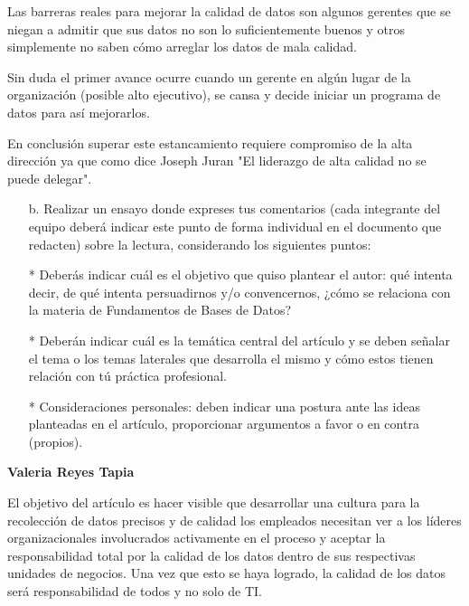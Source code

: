\documentclass{article}
\begin{document}
Las barreras reales para mejorar la calidad de datos son algunos gerentes que se niegan a admitir que sus datos no son lo suficientemente buenos y otros simplemente no saben cómo arreglar los datos de mala calidad.

Sin duda el primer avance ocurre cuando un gerente en algún lugar de la organización  (posible alto ejecutivo), se cansa y decide iniciar un programa de datos para así mejorarlos.

En conclusión superar este estancamiento requiere compromiso de la alta dirección ya que como dice Joseph Juran "El liderazgo de alta calidad no se puede delegar".

\begin{itemize}
    \item[b.]Realizar un ensayo donde expreses tus comentarios (cada integrante del equipo deberá indicar este punto de forma individual en el documento que redacten) sobre la lectura, considerando los siguientes puntos:
\end{itemize}
\begin{itemize}
    \item[*] Deberás indicar cuál es el objetivo que quiso plantear el autor: qué intenta decir, de qué intenta persuadirnos y/o convencernos, ¿cómo se relaciona con la materia de Fundamentos de Bases de Datos?
    \item[*] Deberán indicar cuál es la temática central del artículo y se deben señalar el tema o los temas laterales que desarrolla el mismo y cómo estos tienen relación con tú práctica profesional.
    \item[*] Consideraciones personales: deben indicar una postura ante las ideas planteadas en el artículo, proporcionar argumentos a favor o en contra (propios).
\end{itemize}

\vspace{4mm}
\begin{center}
    \textbf{Valeria Reyes Tapia}
\end{center}
El objetivo del artículo es hacer visible que desarrollar una cultura para la recolección de datos precisos y de calidad los empleados
necesitan ver a los líderes organizacionales involucrados activamente en el proceso y aceptar la responsabilidad total por la calidad
de los datos dentro de sus respectivas unidades de negocios. Una vez que esto se haya logrado, la calidad de los datos será responsabilidad 
de todos y no solo de TI. 
\end{document}

